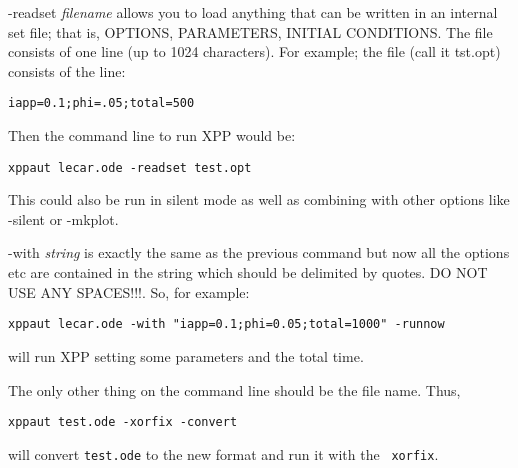 \begin{description}
\item {-readset \emph{filename}} allows you to load anything that can be written in an internal set file; that is, OPTIONS, PARAMETERS, INITIAL CONDITIONS.  The file consists of one line (up to 1024 characters). For example; the file (call it {\ttfamily tst.opt}) consists of the line:
\begin{verbatim}
iapp=0.1;phi=.05;total=500
\end{verbatim} 
Then the command line to run XPP would be:
\begin{verbatim}
xppaut lecar.ode -readset test.opt
\end{verbatim}
This could also be run in silent mode as well as combining with other options like -silent or -mkplot.
\item {-with \emph{string}} is exactly the same as the previous command but now all the options etc are contained in the string which should be delimited by quotes. DO NOT USE ANY SPACES!!!.  So, for example:
\begin{verbatim}
xppaut lecar.ode -with "iapp=0.1;phi=0.05;total=1000" -runnow
\end{verbatim}
will run XPP setting some parameters and the total time.  
\end{description}
The only other thing on the command line should be the file name.  
Thus, 
\begin{verbatim}
xppaut test.ode -xorfix -convert
\end{verbatim}
will convert {\tt test.ode} to the new format and run it with the {\tt
xorfix}.














